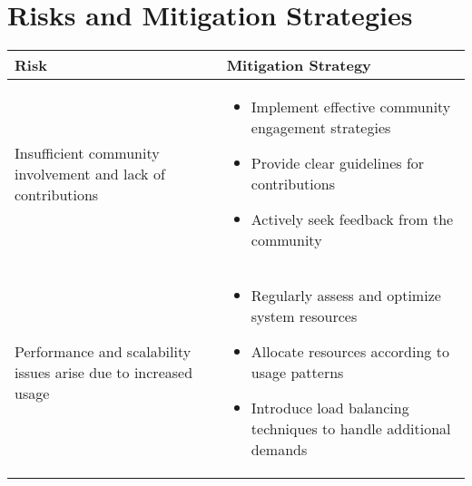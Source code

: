 
\chapter{Risks and Mitigation Strategies} %

\label{Chapter5} %




\begin{center}
    \begin{tabular}{|p{}|p{}|} 
     \hline
     Risk & Mitigation Strategy \\
     \hline\hline
     Insufficient community involvement and lack of contributions &
     \begin{itemize}
        \item Implement effective community engagement strategies
        \item Provide clear guidelines for contributions
        \item Actively seek feedback from the community
     \end{itemize} \\ \hline

     Performance and scalability issues arise due to increased usage &
     \begin{itemize}
        \item Regularly assess and optimize system resources
        \item Allocate resources according to usage patterns
        \item Introduce load balancing techniques to handle additional demands
     \end{itemize} \\ \hline
    \end{tabular}
\end{center}